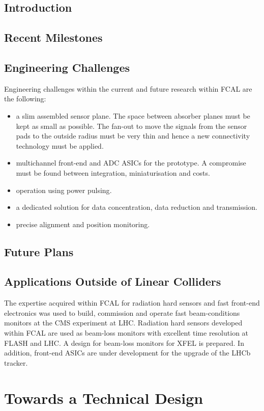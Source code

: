\subsection{Introduction}

\subsection{Recent Milestones}
\subsection{Engineering Challenges}
Engineering challenges within the current and future research within FCAL are the following:
\begin{itemize}
\item{a slim assembled sensor plane. The space between absorber planes must be kept as small
as possible. The fan-out to move the signals from the sensor pads to the outside radius must be very thin and
hence a new connectivity technology must be applied.}
\item{multichannel front-end and ADC ASICs for the prototype.
A compromise must be found between integration, miniaturisation and costs}.
\item{operation using power pulsing}.
\item{a dedicated solution for data concentration, data reduction and transmission}.
\item{precise alignment and position monitoring}.
\end{itemize}

\subsection{Future Plans}
\subsection{Applications Outside of Linear Colliders}

The expertise acquired within FCAL for radiation hard sensors and fast front-end electronics was
used to build, commission and operate fast
beam-conditions monitors at the CMS experiment at LHC.
Radiation hard sensors developed within FCAL are used as beam-loss monitors
with excellent time resolution at FLASH and LHC. A design for beam-loss monitors for XFEL is prepared.
In addition, front-end ASICs are under development for the upgrade of the LHCb tracker.

\section{Towards a Technical Design}


